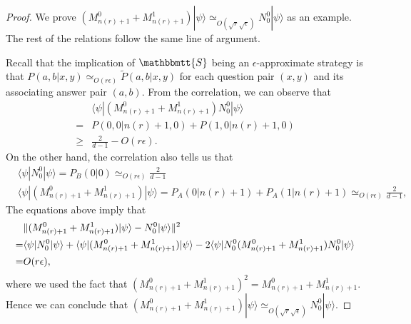 \documentclass[11pt,letterpaper]{article}
\newcommand{\ket}[1]{|#1\rangle}
\newcommand{\bra}[1]{\langle#1|}
\DeclarePairedDelimiter{\norm}{\lVert}{\rVert}
\newcommand{\1}{\mathbb{1}}
\newcommand{\nr}{n(r)}
\newcommand{\bS}{\mathbbmtt{S}}
\newcommand{\pr}[2]{P(#1|#2)}
\newcommand{\pa}[2]{P_A(#1|#2)}
\newcommand{\pb}[2]{P_B(#1|#2)}
\newcommand{\tpr}[2]{\tilde{P}(#1|#2)}
\newcommand{\ep}{\epsilon}
\newcommand{\se}{\sqrt{\epsilon}}
\newcommand{\sr}{\sqrt{r}}
\newcommand{\appd}[1]{\simeq_{#1}}
\theoremstyle{definition}
\begin{document}
\begin{proof} 
We prove $(M_{\nr+1}^0+M_{\nr+1}^1)\ket{\psi} \appd{O(\sr \se)} N_0^0 \ket{\psi}$ as an example.
The rest of the relations follow the same line of argument.

Recall that the implication of $\bS$ being an $\ep$-approximate strategy is that 
$\pr{a,b}{x,y} \appd{O(r \ep)} \tpr{a,b}{x,y}$ for each question 
pair $(x,y)$ and its associating answer pair $(a,b)$.
From the correlation, we can observe that
\begin{align*}
 &\bra{\psi} (M_{\nr+1}^0+M_{\nr+1}^1)N_0^0 \ket{\psi} \\
 = &\pr{0,0}{\nr+1,0} + \pr{1,0}{\nr+1,0}\\
 \geq &\frac{2}{d-1} - O(r \ep).
\end{align*}
On the other hand, the correlation also tells us that 
\begin{align*}
	&\bra{\psi} N_0^0 \ket{\psi} = \pb{0}{0} \appd{O(r\ep)} \frac{2}{d-1}\\
 &\bra{\psi}(M_{\nr+1}^0+M_{\nr+1}^1)\ket{\psi} 
 = \pa{0}{\nr+1} + \pa{1}{\nr+1}
 \appd{O(r\ep)} \frac{2}{d-1},
\end{align*}
The equations above imply that 
\begin{align*}
	&\norm{(M_{\nr+1}^0 + M_{\nr+1}^1) \ket{\psi} - N_0^0 \ket{\psi}}^2 \\
	= &\bra{\psi} N_0^0 \ket{\psi}+\bra{\psi}(M_{\nr+1}^0+M_{\nr+1}^1)\ket{\psi} - 2\bra{\psi}N_0^0(M_{\nr+1}^0 + M_{\nr+1}^1)N_0^0 \ket{\psi}\\
	= &O(r \ep),
\end{align*}
where we used the fact that $(M_{\nr+1}^0 + M_{\nr+1}^1)^2 = M_{\nr+1}^0 + M_{\nr+1}^1$.
Hence we can conclude that $(M_{\nr+1}^0 + M_{\nr+1}^1)\ket{\psi} \appd{O(\sr \se)} N_0^0\ket{\psi}$.
\end{proof}
\end{document}
